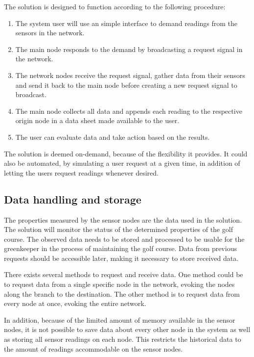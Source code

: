 The solution is designed to function according to the following procedure:
\begin{enumerate}
	\item The system user will use an simple interface to demand readings from the sensors in the network.
	\item The main node responds to the demand by broadcasting a request signal in the network.
	\item The network nodes receive the request signal, gather data from their sensors and send it back to the main node before creating a new request signal to broadcast.
	\item The main node collects all data and appends each reading to the respective origin node in a data sheet made available to the user.
	\item The user can evaluate data and take action based on the results.
\end{enumerate}

The solution is deemed on-demand, because of the flexibility it provides. It could also be automated, by simulating a user request at a given time, in addition of letting the users request readings whenever desired.


\subsection{Data handling and storage}
The properties measured by the sensor nodes are the data used in the solution. The solution will monitor the status of the determined properties of the golf course. The observed data needs to be stored and processed to be usable for the greenkeeper in the process of maintaining the golf course. Data from previous requests should be accessible later, making it necessary to store received data.

There exists several methods to request and receive data. One method could be to request data from a single specific node in the network, evoking the  nodes along the branch to the destination. The other method is to request data from every node at once, evoking the entire network. 

In addition, because of the limited amount of memory available in the sensor nodes, it is not possible to save data about every other node in the system as well as storing all sensor readings on each node. This restricts the historical data to the amount of readings accommodable on the sensor nodes.

